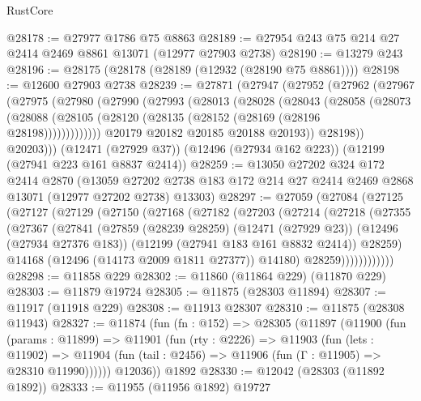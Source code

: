 \begin{lexlean}{RustCore}
\begin{coremodule}
@28178 := @27977 @1786 @75 @8863
@28189 := @27954 @243 @75 @214 @27 @2414 @2469 @8861 @13071 (@12977 @27903 @2738)
@28190 := @13279 @243
@28196 := @28175 (@28178 (@28189 (@12932 (@28190 @75 @8861))))
@28198 := @12600 @27903 @2738
@28239 := @27871
    (@27947
      (@27952
        (@27962
          (@27967
            (@27975
              (@27980
                (@27990
                  (@27993
                    (@28013
                      (@28028
                        (@28043
                          (@28058
                            (@28073
                              (@28088
                                (@28105 (@28120 (@28135 (@28152 (@28169 (@28196 @28198)))))))))))))
                  @20179
                  @20182
                  @20185
                  @20188
                  @20193))
              @28198))
          @20203)))
    (@12471 (@27929 @37))
    (@12496 (@27934 @162 @223))
    (@12199 (@27941 @223 @161 @8837 @2414))
@28259 := @13050
    @27202
    @324
    @172
    @2414
    @2870
    (@13059 @27202 @2738 @183 @172 @214 @27 @2414 @2469 @2868 @13071 (@12977 @27202 @2738) @13303)
@28297 := @27059
    (@27084
      (@27125
        (@27127
          (@27129
            (@27150
              (@27168
                (@27182
                  (@27203
                    (@27214
                      (@27218
                        (@27355
                          (@27367
                            (@27841
                              (@27859
                                (@28239 @28259)
                                (@12471 (@27929 @23))
                                (@12496 (@27934 @27376 @183))
                                (@12199 (@27941 @183 @161 @8832 @2414))
                                @28259)
                              @14168
                              (@12496 (@14173 @2009 @1811 @27377))
                              @14180)
                            @28259))))))))))))
@28298 := @11858 @229
@28302 := @11860 (@11864 @229) (@11870 @229)
@28303 := @11879 @19724
@28305 := @11875 (@28303 @11894)
@28307 := @11917 (@11918 @229)
@28308 := @11913 @28307
@28310 := @11875 (@28308 @11943)
@28327 := @11874
    (fun (fn : @152) =>
    @28305
      (@11897
        (@11900
          (fun (params : @11899) =>
          @11901
            (fun (rty : @2226) =>
            @11903
              (fun (lets : @11902) =>
              @11904 (fun (tail : @2456) => @11906 (fun (Γ : @11905) => @28310 @11990))))))
        @12036))
    @1892
@28330 := @12042 (@28303 (@11892 @1892))
@28333 := @11955 (@11956 @1892) @19727

\end{coremodule}
\end{lexlean}
